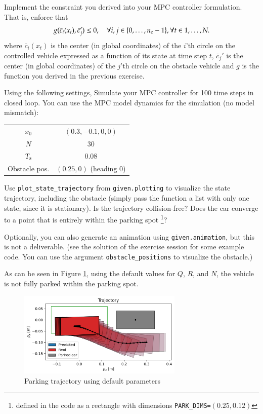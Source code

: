 \documentclass[]{article}
\begin{document}
\begin{assignment}
	Implement the constraint you derived into your MPC controller formulation.
	That is, enforce that 
	\[
		g(\bar{c}_i(x_t), \bar{c}_j') \leq 0, \quad \forall i,j \in \{0, \dots, n_{\mathrm{c}}-1\}, \forall t \in 1, \dots, N. 
	\]
	where $\bar{c}_{i}(x_t)$ is the center (in global coordinates) of the $i$'th circle on the 
	controlled vehicle expressed as a function of its state at time step $t$,
	$\bar{c}_j'$ is the center (in global coordinates) of the $j$'th circle 
	on the obstacle vehicle and $g$ is the function you derived in the previous 
	exercise.

	Using the following settings, Simulate your MPC controller for 100 time steps in closed loop.
	You can use the MPC model dynamics for the simulation (no model mismatch):
	
	\begin{center}
	\begin{tabular}{cc}
		\toprule
		$x_0$ & $(0.3, -0.1, 0, 0)$ \\
		$N$   & 30 \\ 
		$T_{\mathrm{s}}$ & 0.08 \\ 
		Obstacle pos. & $(0.25, 0)$ (heading 0)\\
		\bottomrule
	\end{tabular}
	\end{center}
	
	Use \texttt{plot\_state\_trajectory} from \texttt{given.plotting} to 
	visualize the state trajectory, including the obstacle (simply pass the function a list with only one state, since it is stationary).
	Is the trajectory collision-free? 
	Does the car converge to a point that is entirely within the parking spot
	\footnote{
	defined in the code as a rectangle with dimensions \texttt{PARK\_DIMS=}$(0.25, 0.12)$
	}?

	Optionally, you can also generate an animation using \texttt{given.animation}, but this is 
	not a deliverable.
	(see the solution of the exercise session for some example code. You can use the argument \texttt{obstacle\_positions} to visualize the obstacle.)
\end{assignment}
\begin{flushleft}
	As can be seen in Figure \ref{fig:assignment4_4}, using the default values for $Q$, $R$, and $N$, the vehicle is not fully parked within the parking spot.
\end{flushleft}
\begin{figure}[H]
    \centering
    \includegraphics[width=0.7\textwidth]{images/Assignment_44.png}
    \caption{Parking trajectory using default parameters}
    \label{fig:assignment4_4}
\end{figure}
\end{document}
